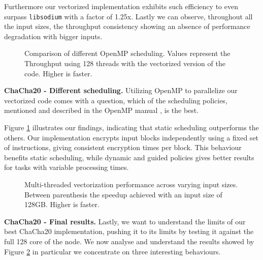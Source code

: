 \documentclass[letterpaper]{article}
\newcommand{\mypar}[1]{{\bf #1.}}
\begin{document}
Furthermore our vectorized implementation exhibits such efficiency to even surpass \texttt{libsodium} with a factor of 1.25x.
Lastly we can observe, throughout all the input sizes, the throughput consistency showing an absence of performance degradation with bigger inputs.

\begin{figure}
\centering
	
	\caption{Comparison of different OpenMP scheduling. Values represent the Throughput using 128 threads with the vectorized version of the code. Higher is faster.
  \label{fig:enc_comparison}}
  \vspace{-5pt}
\end{figure}

\mypar{ChaCha20 - Different scheduling}
Utilizing OpenMP to parallelize our vectorized code comes with a question, which of the scheduling policies, mentioned and described in the OpenMP manual \cite{openMP}, is the best. 

Figure \ref{fig:enc_comparison} illustrates our findings, indicating that static scheduling outperforms the others.
Our implementation encrypts input blocks independently using a fixed set of instructions, giving consistent encryption times per block. This behaviour benefits static scheduling, while dynamic and guided policies gives better results for tasks with variable processing times. 

\begin{figure}[h]
\centering
	
	\caption{Multi-threaded vectorization performance across varying input sizes. Between parenthesis the speedup achieved with an input size of 128GB. Higher is faster.
  \label{fig:enc_opt2}}
  \vspace{-5pt}
\end{figure}

\mypar{ChaCha20 - Final results}
Lastly, we want to understand the limits of our best ChaCha20 implementation, pushing it to its limits by testing it against the full 128 core of the node.
We now analyse and understand the results showed by Figure \ref{fig:enc_opt2} in particular we concentrate on three interesting behaviours.
\end{document}
